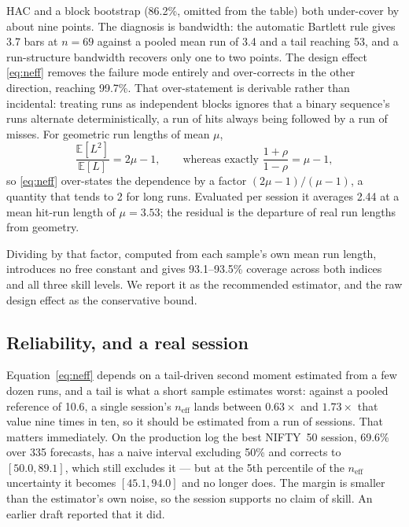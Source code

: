 \documentclass[runningheads]{llncs}
\begin{document}
HAC and a block bootstrap (86.2\%, omitted from the table) both under-cover by
about nine points. The diagnosis is bandwidth: the automatic Bartlett rule gives
3.7 bars at $n=69$ against a pooled mean run of 3.4 and a tail reaching 53, and a
run-structure bandwidth recovers only one to two points. The design effect \eqref{eq:neff} removes the failure mode entirely and over-corrects in the
other direction, reaching 99.7\%. That over-statement is derivable rather than
incidental: treating runs as independent blocks ignores that a binary sequence's
runs alternate deterministically, a run of hits always being followed by a run of
misses. For geometric run lengths of mean $\mu$,
\begin{equation}
\frac{\mathbb{E}[L^2]}{\mathbb{E}[L]} = 2\mu - 1,
\qquad
\text{whereas exactly } \frac{1+\rho}{1-\rho} = \mu - 1,
\label{eq:alt}
\end{equation}
so \eqref{eq:neff} over-states the dependence by a factor $(2\mu-1)/(\mu-1)$, a
quantity that tends to 2 for long runs. Evaluated per session it averages 2.44
at a mean hit-run length of $\mu = 3.53$; the residual is the departure of real
run lengths from geometry.

Dividing by that factor, computed from each sample's own mean run length,
introduces no free constant and gives 93.1--93.5\% coverage across both indices
and all three skill levels. We report it as the recommended estimator, and the
raw design effect as the conservative bound.

\subsection{Reliability, and a real session}

Equation~\eqref{eq:neff} depends on a tail-driven second moment estimated from a
few dozen runs, and a tail is what a short sample estimates worst: against a
pooled reference of 10.6, a single session's $n_{\text{eff}}$ lands between
$0.63\times$ and $1.73\times$ that value nine times in ten, so it should be
estimated from a run of sessions. That matters immediately. On the production log
the best NIFTY~50 session, 69.6\% over 335 forecasts, has a naive interval
excluding 50\% and corrects to $[50.0, 89.1]$, which still excludes it --- but at
the 5th percentile of the $n_{\text{eff}}$ uncertainty it becomes
$[45.1, 94.0]$ and no longer does. The margin is smaller than the estimator's own
noise, so the session supports no claim of skill. An earlier draft reported that
it did.
\end{document}
